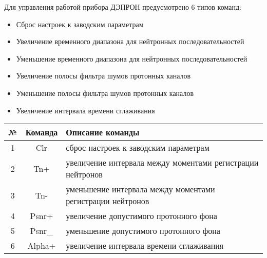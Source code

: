 Для управления работой прибора ДЭПРОН предусмотрено 6 типов команд:

\begin{itemize}
	\item 	Сброс настроек к заводским параметрам

	\item Увеличение временного диапазона для нейтронных последовательностей

	\item Уменьшение временного диапазона для нейтронных последовательностей

	\item Увеличение полосы фильтра шумов протонных каналов

	\item Уменьшение полосы фильтра шумов протонных каналов

	\item Увеличение интервала времени сглаживания

\end{itemize}


\small
\begin{center}
	\begin{tabularx}{\textwidth}{|c|c|X|}
		\hline
		№ & Команда & Описание 
		команды                                           \\ \hline
		1 &   Clr   & сброс настроек к заводским 
		параметрам                      \\ \hline
		2 &   Tn+   & увеличение интервала между моментами регистрации 
		нейтронов \\ \hline
		3 &   Tn-   & уменьшение интервала между моментами регистрации 
		нейтронов \\ \hline
		4 &  Psnr+  & увеличение допустимого протонного 
		фона                     \\ \hline
		5 & Psnr\_  & уменьшение допустимого протонного 
		фона                     \\ \hline
		6 & Alpha+  & увеличение интервала времени 
		сглаживания                   \\ \hline
	\end{tabularx}  
\end{center}
\normalsize



